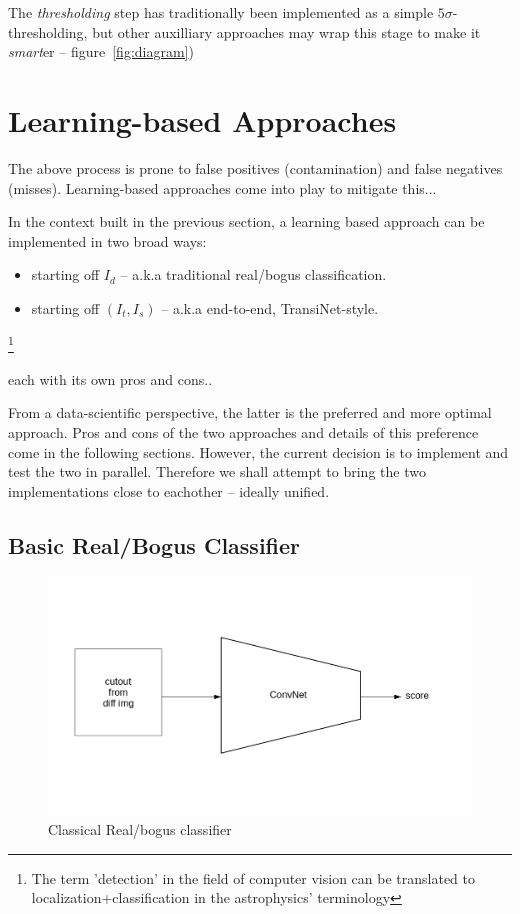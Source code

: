 The \emph{thresholding} step has traditionally been implemented as a simple $5\sigma$-thresholding, but other auxilliary approaches may wrap this stage to make it \emph{smart}er -- figure~\ref{fig:diagram})


\section{Learning-based Approaches}
\label{sec:learning}
The above process is prone to false positives (contamination) and false negatives (misses). Learning-based approaches come into play to mitigate this...

In the context built in the previous section, a learning based approach can be implemented in two broad ways:
\begin{itemize}
\item starting off $I_d$ -- a.k.a traditional real/bogus classification.
\item starting off $(I_t,I_s)$ -- a.k.a end-to-end, TransiNet-style.
\end{itemize}

\footnote{The term 'detection' in the field of computer vision can be translated to localization+classification in the astrophysics' terminology}


each with its own pros and cons..

From a data-scientific perspective, the latter is the preferred and more optimal approach. Pros and cons of the two approaches and details of this preference come in the following sections. However, the current decision is to implement and test the two in parallel. Therefore we shall attempt to bring the two implementations close to eachother -- ideally unified.


\subsection{Basic Real/Bogus Classifier}

\begin{figure}[h]
  \centering
  \includegraphics[width=.8\textwidth]{material/rb-classifier}
  \caption{Classical Real/bogus classifier}
  \label{fig:rbdiagram}
\end{figure}

